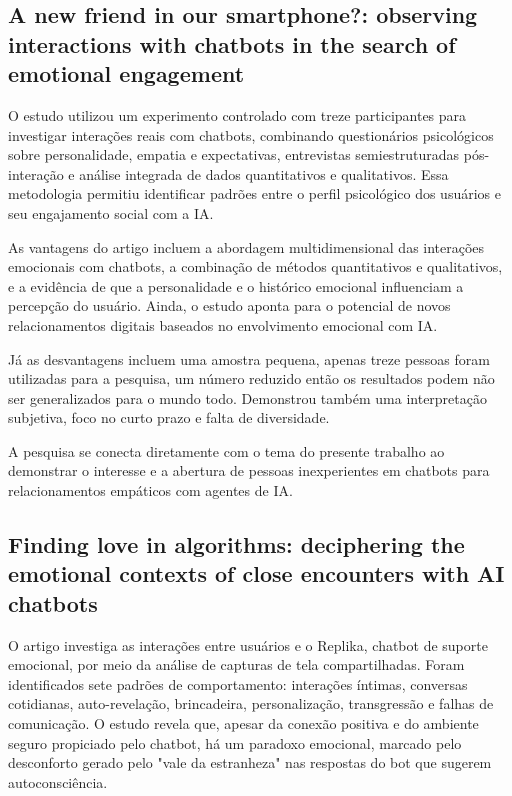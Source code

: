 \documentclass[12pt]{article}
\begin{document}
\subsection{A new friend in our smartphone?: observing interactions with chatbots in the search of emotional engagement}
O estudo utilizou um experimento controlado com treze participantes para investigar interações reais com chatbots, combinando questionários psicológicos sobre personalidade, empatia e expectativas, entrevistas semiestruturadas pós-interação e análise integrada de dados quantitativos e qualitativos. Essa metodologia permitiu identificar padrões entre o perfil psicológico dos usuários e seu engajamento social com a IA.

As vantagens do artigo incluem a abordagem multidimensional das interações emocionais com chatbots, a combinação de métodos quantitativos e qualitativos, e a evidência de que a personalidade e o histórico emocional influenciam a percepção do usuário. Ainda, o estudo aponta para o potencial de novos relacionamentos digitais baseados no envolvimento emocional com IA.

Já as desvantagens incluem uma amostra pequena, apenas treze pessoas foram utilizadas para a pesquisa, um número reduzido então os resultados podem não ser generalizados para o mundo todo. Demonstrou também uma interpretação subjetiva, foco no curto prazo e falta de diversidade.

A pesquisa se conecta diretamente com o tema do presente trabalho ao demonstrar o interesse e a abertura de pessoas inexperientes em chatbots para relacionamentos empáticos com agentes de IA. \cite{newfriendinoursmartphone}

\subsection{Finding love in algorithms: deciphering the emotional contexts of close encounters with AI chatbots}

O artigo investiga as interações entre usuários e o Replika, chatbot de suporte emocional, por meio da análise de capturas de tela compartilhadas. Foram identificados sete padrões de comportamento: interações íntimas, conversas cotidianas, auto-revelação, brincadeira, personalização, transgressão e falhas de comunicação. O estudo revela que, apesar da conexão positiva e do ambiente seguro propiciado pelo chatbot, há um paradoxo emocional, marcado pelo desconforto gerado pelo "vale da estranheza" nas respostas do bot que sugerem autoconsciência.
\end{document}
